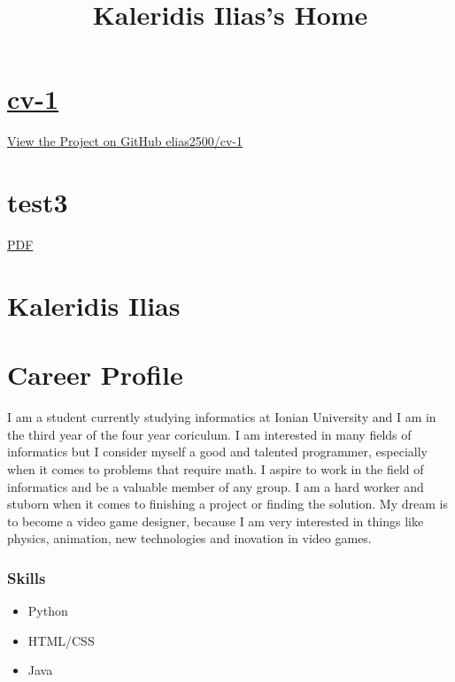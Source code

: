 \documentclass[american,]{article}
\title{Kaleridis Ilias's Home}
\date{}
\begin{document}
\maketitle

\hypertarget{cv-1}{%
\section{\texorpdfstring{\href{http://0.0.0.0:4000/}{cv-1}}{cv-1}}\label{cv-1}}

\href{https://github.com/elias2500/cv-1}{View the Project on GitHub
{elias2500/cv-1}}

\hypertarget{test3}{%
\section{test3}\label{test3}}

\href{pdf/index.pdf}{PDF}

\hypertarget{kaleridis-ilias}{%
\section{Kaleridis Ilias}\label{kaleridis-ilias}}

\hypertarget{career-profile}{%
\section{Career Profile}\label{career-profile}}

I am a student currently studying informatics at Ionian University and I
am in the third year of the four year coriculum. I am interested in many
fields of informatics but I consider myself a good and talented
programmer, especially when it comes to problems that require math. I
aspire to work in the field of informatics and be a valuable member of
any group. I am a hard worker and stuborn when it comes to finishing a
project or finding the solution. My dream is to become a video game
designer, because I am very interested in things like physics,
animation, new technologies and inovation in video games.

\hypertarget{skills}{%
\subsubsection{Skills}\label{skills}}

\begin{itemize}
\item
  Python
\item
  HTML/CSS
\item
  Java
\end{itemize}
\end{document}
